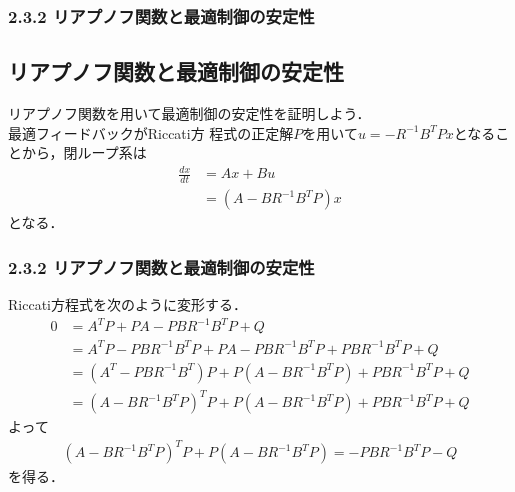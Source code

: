 \begin{frame}[t]
\frametitle{2.3.2 リアプノフ関数と最適制御の安定性}
\subsection{リアプノフ関数と最適制御の安定性}
リアプノフ関数を用いて最適制御の安定性を証明しよう．
\\[3mm]

最適フィードバックがRiccati方
程式の正定解$P$を用いて$u = -R^{-1} B^T P x$となることから，閉ループ系は
\begin{align}
 \frac{dx}{dt} &= Ax + B u \nonumber \\
               &= (A - B R^{-1} B^T P)x
 \label{LQ_optD}
\end{align}
となる．
\end{frame}

\begin{frame}[t]
\frametitle{2.3.2 リアプノフ関数と最適制御の安定性}
Riccati方程式を次のように変形する．
\begin{align}
	0 &= A^T P + P A - P B R^{-1} B^T P + Q 
\nonumber \\
	&=  A^T P - P B R^{-1} B^T P + P A - P B R^{-1} B^T P + P B R^{-1} B^T P + Q
\nonumber \\
	&= (A^T - P B R^{-1} B^T ) P + P(A-  B R^{-1} B^T P) + P B R^{-1} B^T P + Q
\nonumber \\
	&= (A - B R^{-1} B^T P )^T P + P(A-  B R^{-1} B^T P) + P B R^{-1} B^T P + Q
\end{align}
よって
\begin{align}
	(A - B R^{-1} B^T P )^T P + P(A-  B R^{-1} B^T P) = - P B R^{-1} B^T P - Q
\end{align}
を得る．
\end{frame}

